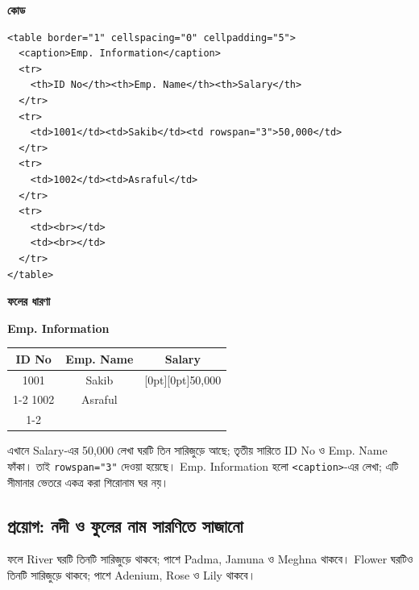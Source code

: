 \par\noindent
\begin{minipage}[t]{.54\linewidth}\vspace{0pt}\small
\textbf{\color{chFourTeal}কোড}\par
\begin{verbatim}
<table border="1" cellspacing="0" cellpadding="5">
  <caption>Emp. Information</caption>
  <tr>
    <th>ID No</th><th>Emp. Name</th><th>Salary</th>
  </tr>
  <tr>
    <td>1001</td><td>Sakib</td><td rowspan="3">50,000</td>
  </tr>
  <tr>
    <td>1002</td><td>Asraful</td>
  </tr>
  <tr>
    <td><br></td>
    <td><br></td>
  </tr>
</table>
\end{verbatim}
\par\smallskip
\end{minipage}\hfill
\begin{minipage}[t]{.42\linewidth}\vspace{0pt}\small
\textbf{\color{chFourTeal}ফলের ধারণা}\par
\begin{center}
\textbf{Emp. Information}\par\smallskip
\begin{tabular}{|c|c|c|}
\hline
\textbf{ID No} & \textbf{Emp. Name} & \textbf{Salary} \\
\hline
1001 & Sakib & \raisebox{-\normalbaselineskip}[0pt][0pt]{50,000} \\
\cline{1-2}
1002 & Asraful & \\
\cline{1-2}
 & & \\
\hline
\end{tabular}
\end{center}
এখানে Salary-এর 50,000 লেখা ঘরটি তিন সারিজুড়ে আছে; তৃতীয় সারিতে ID No ও Emp. Name ফাঁকা। তাই \texttt{rowspan="3"} দেওয়া হয়েছে। Emp. Information হলো \texttt{<caption>}-এর লেখা; এটি সীমানার ভেতরে একত্র করা শিরোনাম ঘর নয়।
\par\smallskip
\end{minipage}\par






\subsection{প্রয়োগ: নদী ও ফুলের নাম সারণিতে সাজানো}
ফলে River ঘরটি তিনটি সারিজুড়ে থাকবে; পাশে Padma, Jamuna ও Meghna থাকবে। Flower ঘরটিও তিনটি সারিজুড়ে থাকবে; পাশে Adenium, Rose ও Lily থাকবে।

